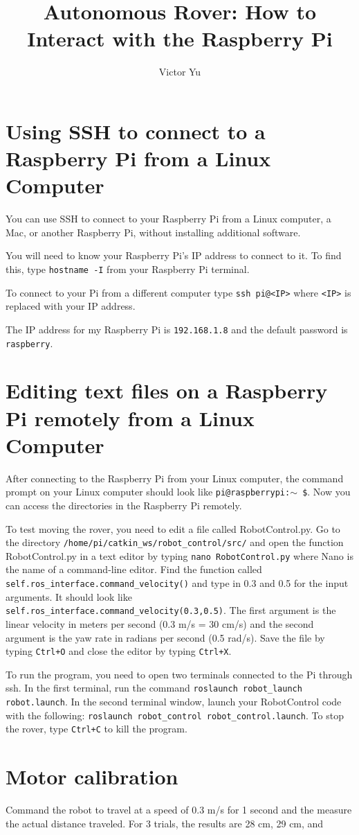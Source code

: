 \documentclass{article}
\title{Autonomous Rover: How to Interact with the Raspberry Pi}
\author{Victor Yu}
\begin{document}
	\maketitle
	
	\section{Using SSH to connect to a Raspberry Pi from a Linux Computer}
	You can use SSH to connect to your Raspberry Pi from a Linux computer, a Mac, or another Raspberry Pi, without installing additional software.
	
	You will need to know your Raspberry Pi's IP address to connect to it. To find this, type \texttt{hostname -I} from your Raspberry Pi terminal.
	
	To connect to your Pi from a different computer type \texttt{ssh pi@<IP>} where \texttt{<IP>} is replaced with your IP address.
	
	The IP address for my Raspberry Pi is \texttt{192.168.1.8} and the default password is \texttt{raspberry}.
	
	\section{Editing text files on a Raspberry Pi remotely from a Linux Computer}
	
	After connecting to the Raspberry Pi from your Linux computer, the command prompt on your Linux computer should look like \texttt{pi@raspberrypi:$\sim$ \$}. Now you can access the directories in the Raspberry Pi remotely.
	
	To test moving the rover, you need to edit a file called RobotControl.py. Go to the directory \texttt{/home/pi/catkin\_ws/robot\_control/src/} and open the function RobotControl.py in a text editor by typing \texttt{nano RobotControl.py}
	where Nano is the name of a command-line editor. Find the function called	\texttt{self.ros\_interface.command\_velocity()} and type in 0.3 and 0.5 for the input arguments. It should look like \texttt{self.ros\_interface.command\_velocity\allowbreak(0.3,0.5)}. The first argument is the linear velocity in meters per second (0.3 m/s = 30 cm/s) and the second argument is the yaw rate in radians per second (0.5 rad/s). Save the file by typing \texttt{Ctrl+O} and close the editor by typing \texttt{Ctrl+X}.
	
	To run the program, you need to open two terminals connected to the Pi through ssh. In the first terminal, run the command \texttt{roslaunch robot\_launch robot.launch}. In the second terminal window, launch your RobotControl code with the following: \texttt{roslaunch robot\_control robot\_control.launch}. To stop the rover, type \texttt{Ctrl+C} to kill the program.
	
	\section{Motor calibration}
	
	Command the robot to travel at a speed of 0.3 m/s for 1 second and the measure the actual distance traveled. For 3 trials, the results are 28 cm, 29 cm, and 
	
\end{document}
